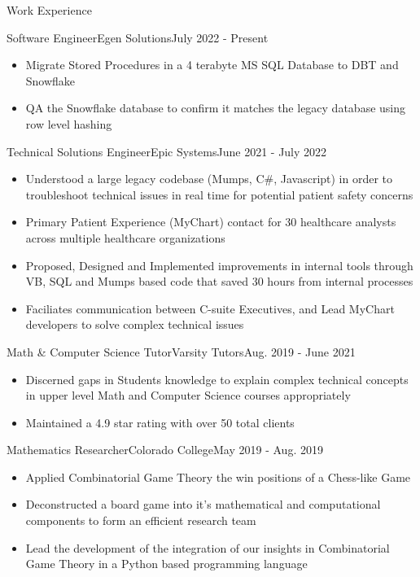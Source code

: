 \begin{cvsection}{Work Experience}

	\begin{cvsubsection}{Software Engineer}{Egen Solutions}{July 2022 - Present}			
			\begin{itemize}
				\item Migrate Stored Procedures in a 4 terabyte MS SQL Database to DBT and Snowflake
				\item QA the Snowflake database to confirm it matches the legacy database using row level hashing
			\end{itemize}
		\end{cvsubsection}
	\begin{cvsubsection}{Technical Solutions Engineer}{Epic Systems}{June 2021 - July 2022}			
		\begin{itemize}
			\item Understood a large legacy codebase (Mumps, C\#, Javascript) in order to troubleshoot technical issues in real time for potential patient safety concerns
			\item Primary Patient Experience (MyChart) contact for 30 healthcare analysts across multiple healthcare organizations
			\item Proposed, Designed and Implemented improvements in internal tools through VB, SQL and Mumps based code that saved 30 hours from internal processes
			\item Faciliates communication between C-suite Executives, and Lead MyChart developers to solve complex technical issues
		\end{itemize}
	\end{cvsubsection}
	
	\begin{cvsubsection}{Math \& Computer Science Tutor}{Varsity Tutors}{Aug. 2019 - June 2021}	
		\begin{itemize}
			\item Discerned gaps in Students knowledge to explain complex technical concepts in upper level Math and Computer Science courses appropriately
			\item Maintained a 4.9 star rating with over 50 total clients
		\end{itemize}
	\end{cvsubsection}
	
	\begin{cvsubsection}{Mathematics Researcher}{Colorado College}{May 2019 - Aug. 2019}
	\begin{itemize}
		\item Applied Combinatorial Game Theory the win positions of a Chess-like Game
		\item Deconstructed a board game into it’s mathematical and computational components to form an efficient research team
		\item Lead the development of the integration of our insights in Combinatorial Game Theory in a Python based programming language
		\end{itemize}
	\end{cvsubsection}
	

\end{cvsection}
